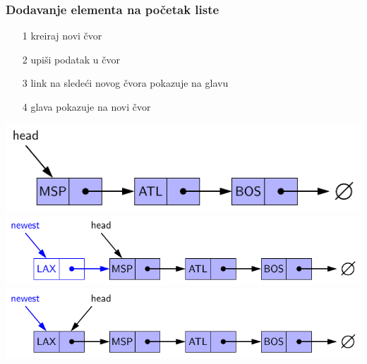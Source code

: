 \documentclass[compress]{beamer}
\begin{document}
\begin{frame}[fragile]
  \frametitle{Dodavanje elementa na početak liste}
  \begin{itemize}
    \item[1] kreiraj novi čvor
    \item[2] upiši podatak u čvor
    \item[3] link na sledeći novog čvora pokazuje na glavu
    \item[4] glava pokazuje na novi čvor
  \end{itemize}
  \begin{center}
    \includegraphics[scale=0.7]{asp-07-pic03a.pdf} \\
    \includegraphics[scale=0.7]{asp-07-pic03b.pdf} \\
    \includegraphics[scale=0.7]{asp-07-pic03c.pdf}
  \end{center}
\end{frame}
\end{document}

